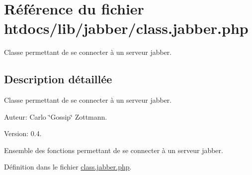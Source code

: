 \hypertarget{class_8jabber_8php}{
\section{R\'{e}f\'{e}rence du fichier htdocs/lib/jabber/class.jabber.php}
\label{class_8jabber_8php}
}
Classe permettant de se connecter \`{a} un serveur jabber.  




\subsection{Description d\'{e}taill\'{e}e}
Classe permettant de se connecter \`{a} un serveur jabber. 

\begin{Desc}
\item[Auteur:]Carlo \char`\"{}Gossip\char`\"{} Zottmann. \end{Desc}
\begin{Desc}
\item[Version:]0.4.\end{Desc}
Ensemble des fonctions permettant de se connecter \`{a} un serveur jabber.

D\'{e}finition dans le fichier \hyperlink{class_8jabber_8php-source}{class.jabber.php}.